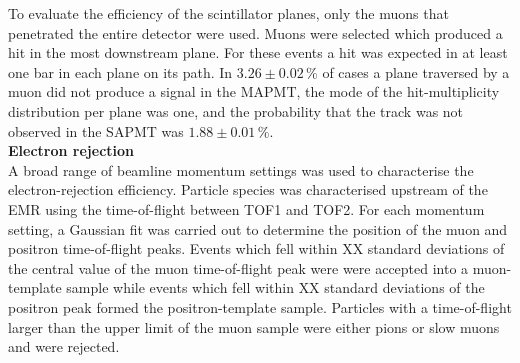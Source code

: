 To evaluate the efficiency of the scintillator planes, only the muons
that penetrated the entire detector were used.
Muons were selected which produced a hit in the most downstream plane.
For these events a hit was expected in at least one bar in each plane
on its path.
In $3.26\pm0.02\,\%$ of cases a plane traversed by a muon did not
produce a signal in the MAPMT, the mode of the hit-multiplicity
distribution per plane was one, and the probability that the track was
not observed in the SAPMT was $1.88\pm0.01\,\%$. \\

\noindent\textbf{Electron rejection} \\
\noindent
A broad range of beamline momentum settings was used to characterise
the electron-rejection efficiency.
Particle species was characterised upstream of the EMR using the
time-of-flight between TOF1 and TOF2.
For each momentum setting, a Gaussian fit was carried out to determine
the position of the muon and positron time-of-flight peaks.
Events which fell within {\color{red} XX standard deviations} of the
central value of the muon time-of-flight peak were were accepted into
a muon-template sample while events which fell within {\color{red} XX
standard deviations} of the positron peak formed the positron-template
sample. 
Particles with a time-of-flight larger than the upper limit of the
muon sample were either pions or slow muons and were rejected.

